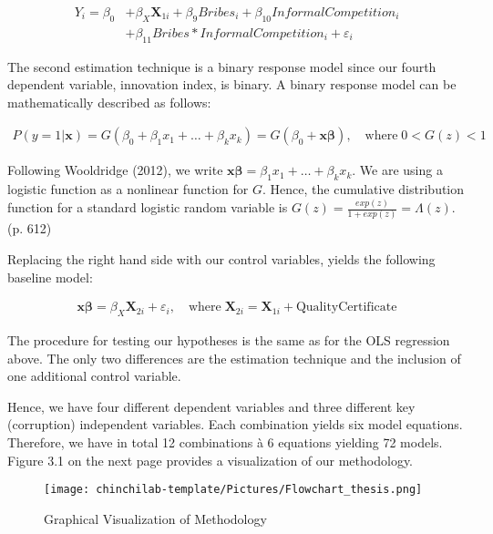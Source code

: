 \begin{equation}\tag{Eq. 3b}
\begin{split}
 Y_{i}=\beta_{0}&+\beta_{X}\boldsymbol{X}_{1i}+\beta_{9}Bribes_{i}+\beta_{10}InformalCompetition_{i} \\
 &+\beta_{11}Bribes*InformalCompetition_{i}+\varepsilon_{i}  
\end{split}
\end{equation}
\newline

The second estimation technique is a binary response model since our fourth dependent variable, innovation index, is binary. 
A binary response model can be mathematically described as follows:

\begin{equation}\tag{BRM}
\begin{split}
 P(y=1|\boldsymbol{x})=G(\beta_{0}+\beta_{1}x_{1}+\dotsc + \beta_{k}x_{k})=G(\beta_{0}+\boldsymbol{x}\boldsymbol{\beta}), \quad \text{where} \; 0<G(z)<1
\end{split}
\end{equation}

Following Wooldridge (2012), we write $\boldsymbol{x}\boldsymbol{\beta}=\beta_{1}x_{1}+\dotsc + \beta_{k}x_{k}.$ We are using a logistic function as a nonlinear function for $G$. Hence, the cumulative distribution function for a standard logistic random variable is $G(z)=\frac{exp(z)}{1+exp(z)}=\Lambda (z)$. (p. 612) 

Replacing the right hand side with our control variables, yields the following baseline model: 

\begin{equation}\tag{Baseline 2}
\begin{split}
\boldsymbol{x}\boldsymbol{\beta}=\beta_{X}\boldsymbol{X}_{2i}+\varepsilon_{i}, \quad \text{where} \; \boldsymbol{X}_{2i}=\boldsymbol{X}_{1i}+\text{QualityCertificate}
\end{split}
\end{equation}

The procedure for testing our hypotheses is the same as for the OLS regression above. The only two differences are the estimation technique and the inclusion of one additional control variable.

Hence, we have four different dependent variables and three different key (corruption) independent variables. Each combination yields six model equations. Therefore, we have in total 12 combinations \`{a} 6 equations yielding 72 models. Figure 3.1 on the next page provides a visualization of our methodology.

\begin{figure}[h]%
    \centering
    \texttt{[image: chinchilab-template/Pictures/Flowchart\_thesis.png]}%
    \caption{Graphical Visualization of Methodology}%
    \label{fig:example}%
\end{figure}